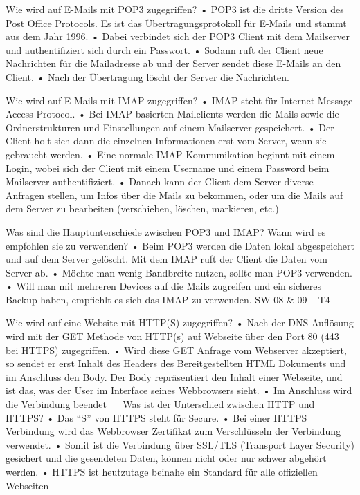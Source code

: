 \begin{itemize}
Wie wird auf E-Mails mit POP3 zugegriffen?
•	POP3 ist die dritte Version des Post Office Protocols. Es ist das Übertragungsprotokoll für E-Mails und stammt aus dem Jahr 1996.
•	Dabei verbindet sich der POP3 Client mit dem Mailserver und authentifiziert sich durch ein Passwort. 
•	Sodann ruft der Client neue Nachrichten für die Mailadresse ab und der Server sendet diese E-Mails an den Client. 
•	Nach der Übertragung löscht der Server die Nachrichten.

Wie wird auf E-Mails mit IMAP zugegriffen?
•	IMAP steht für Internet Message Access Protocol. 
•	Bei IMAP basierten Mailclients werden die Mails sowie die Ordnerstrukturen und Einstellungen auf einem Mailserver gespeichert. 
•	Der Client holt sich dann die einzelnen Informationen erst vom Server, wenn sie gebraucht werden. 
•	Eine normale IMAP Kommunikation beginnt mit einem Login, wobei sich der Client mit einem Username und einem Password beim Mailserver authentifiziert. 
•	Danach kann der Client dem Server diverse Anfragen stellen, um Infos über die Mails zu bekommen, oder um die Mails auf dem Server zu bearbeiten (verschieben, löschen, markieren, etc.)

Was sind die Hauptunterschiede zwischen POP3 und IMAP? Wann wird es empfohlen sie zu verwenden?
•	Beim POP3 werden die Daten lokal abgespeichert und auf dem Server gelöscht. Mit dem IMAP ruft der Client die Daten vom Server ab. 
•	Möchte man wenig Bandbreite nutzen, sollte man POP3 verwenden. 
•	Will man mit mehreren Devices auf die Mails zugreifen und ein sicheres Backup haben, empfiehlt es sich das IMAP zu verwenden.
SW 08 & 09 – T4 

Wie wird auf eine Website mit HTTP(S) zugegriffen?
•	Nach der DNS-Auflösung wird mit der GET Methode von HTTP(s) auf Webseite über den Port 80 (443 bei HTTPS) zugegriffen. 
•	Wird diese GET Anfrage vom Webserver akzeptiert, so sendet er erst Inhalt des Headers des Bereitgestellten HTML Dokuments und im Anschluss den Body. Der Body repräsentiert den Inhalt einer Webseite, und ist das, was der User im Interface seines Webbrowsers sieht. 
•	Im Anschluss wird die Verbindung beendet
 
Was ist der Unterschied zwischen HTTP und HTTPS?
•	Das “S” von HTTPS steht für Secure. 
•	Bei einer HTTPS Verbindung wird das Webbrowser Zertifikat zum Verschlüsseln der Verbindung verwendet. 
•	Somit ist die Verbindung über SSL/TLS (Transport Layer Security) gesichert und die gesendeten Daten, können nicht oder nur schwer abgehört werden. 
•	HTTPS ist heutzutage beinahe ein Standard für alle offiziellen Webseiten


\end{itemize}
